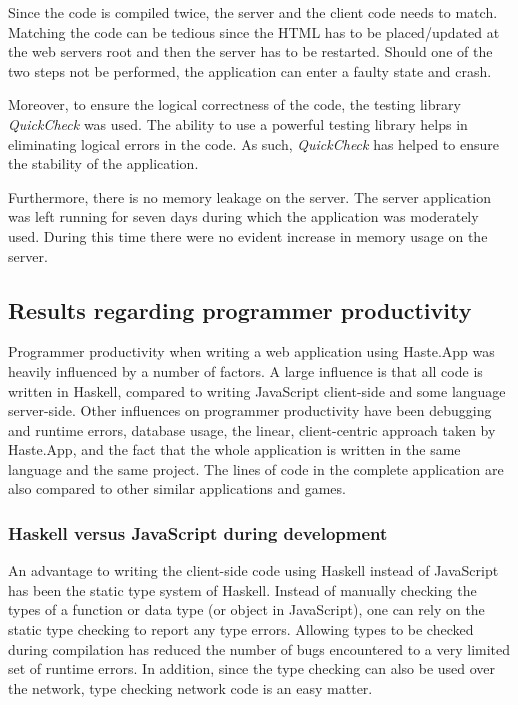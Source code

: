 \documentclass[a4paper]{article}
\begin{document}
Since the code is compiled twice, the server and the client code needs to match. Matching the code can be tedious since the HTML has to be placed/updated at the web servers root and then the server has to be restarted. Should one of the two steps not be performed, the application can enter a faulty state and crash.

Moreover, to ensure the logical correctness of the code, the testing library \textit{QuickCheck} was used. The ability to use a powerful testing library helps in eliminating logical errors in the code. As such, \textit{QuickCheck} has helped to ensure the stability of the application.

Furthermore, there is no memory leakage on the server. The server application was left running for seven days during which the application was moderately used. During this time there were no evident increase in memory usage on the server.

\subsection{Results regarding programmer productivity}
\label{sub:programmer-productivity-results}
Programmer productivity when writing a web application using Haste.App was heavily influenced by a number of factors. A large influence is that all code is written in Haskell, compared to writing JavaScript client-side and some language server-side. Other influences on programmer productivity have been debugging and runtime errors, database usage, the linear, client-centric approach taken by Haste.App, and the fact that the whole application is written in the same language and the same project. The lines of code in the complete application are also compared to other similar applications and games.

\subsubsection{Haskell versus JavaScript during development}
\label{subsub:haskell-vs-js-during-development}
An advantage to writing the client-side code using Haskell instead of JavaScript has been the static type system of Haskell. Instead of manually checking the types of a function or data type (or object in JavaScript), one can rely on the static type checking to report any type errors. Allowing types to be checked during compilation has reduced the number of bugs encountered to a very limited set of runtime errors. In addition, since the type checking can also be used over the network, type checking network code is an easy matter.
\end{document}
